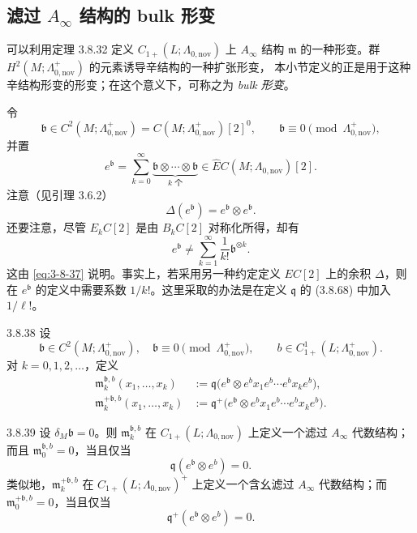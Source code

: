 
\subsection{滤过 $A_\infty$ 结构的 bulk 形变}
\label{subsec:3-8-5}

可以利用定理 3.8.32 定义
$C_{1+}(L;\Lambda_{0,\mathrm{nov}})$ 上 $A_\infty$ 结构
$\mathfrak m$ 的一种形变。群
$H^2(M;\Lambda^+_{0,\mathrm{nov}})$ 的元素诱导辛结构的一种扩张形变，
本小节定义的正是用于这种辛结构形变的形变；在这个意义下，可称之为
\emph{bulk 形变}。

令
\[
 \mathfrak b\in C^2(M;\Lambda^+_{0,\mathrm{nov}})
 =C(M;\Lambda^+_{0,\mathrm{nov}})[2]^0,
 \qquad
 \mathfrak b\equiv0\pmod{\Lambda^+_{0,\mathrm{nov}}},
\]
并置
\[
 e^{\mathfrak b}
 =
 \sum_{k=0}^{\infty}
 \underbrace{\mathfrak b\otimes\cdots\otimes\mathfrak b}_{k\text{ 个}}
 \in\widehat EC(M;\Lambda_{0,\mathrm{nov}})[2].
\]
注意（见引理 3.6.2）
\begin{equation}
 \Delta(e^{\mathfrak b})
 =e^{\mathfrak b}\otimes e^{\mathfrak b}.
\tag{3.8.37}\label{eq:3-8-37}
\end{equation}
还要注意，尽管 $E_kC[2]$ 是由 $B_kC[2]$ 对称化所得，却有
\[
 e^{\mathfrak b}
 \ne
 \sum_{k=1}^{\infty}\frac{1}{k!}\mathfrak b^{\otimes k}.
\]
这由 \eqref{eq:3-8-37} 说明。事实上，若采用另一种约定定义
$EC[2]$ 上的余积 $\Delta$，则在 $e^{\mathfrak b}$ 的定义中需要系数
$1/k!$。这里采取的办法是在定义 $\mathfrak q$ 的
(3.8.68) 中加入 $1/\ell!$。

\begin{definition}{3.8.38}\label{def:3-8-38}
设
\[
 \mathfrak b\in C^2(M;\Lambda^+_{0,\mathrm{nov}}),
 \quad
 \mathfrak b\equiv0\pmod{\Lambda^+_{0,\mathrm{nov}}},
 \qquad
 b\in C^1_{1+}(L;\Lambda^+_{0,\mathrm{nov}}).
\]
对 $k=0,1,2,\ldots$，定义
\[
\begin{aligned}
 \mathfrak m_k^{\mathfrak b,b}(x_1,\ldots,x_k)
 &:=
 \mathfrak q\bigl(
 e^{\mathfrak b}\otimes
 e^b x_1e^b\cdots e^b x_ke^b
 \bigr),\\
 \mathfrak m_k^{+\mathfrak b,b}(x_1,\ldots,x_k)
 &:=
 \mathfrak q^+\bigl(
 e^{\mathfrak b}\otimes
 e^b x_1e^b\cdots e^b x_ke^b
 \bigr).
\end{aligned}
\]
\end{definition}

\begin{lemma}{3.8.39}\label{lem:3-8-39}
设 $\delta_M\mathfrak b=0$。则
$\mathfrak m_k^{\mathfrak b,b}$ 在
$C_{1+}(L;\Lambda_{0,\mathrm{nov}})$ 上定义一个滤过
$A_\infty$ 代数结构；而且
$\mathfrak m_0^{\mathfrak b,b}=0$，当且仅当
\[
 \mathfrak q(e^{\mathfrak b}\otimes e^b)=0.
\]
类似地，$\mathfrak m_k^{+\mathfrak b,b}$ 在
$C_{1+}(L;\Lambda_{0,\mathrm{nov}})^+$ 上定义一个含幺滤过
$A_\infty$ 代数结构；而
$\mathfrak m_0^{+\mathfrak b,b}=0$，当且仅当
\[
 \mathfrak q^+(e^{\mathfrak b}\otimes e^b)=0.
\]
\end{lemma}

